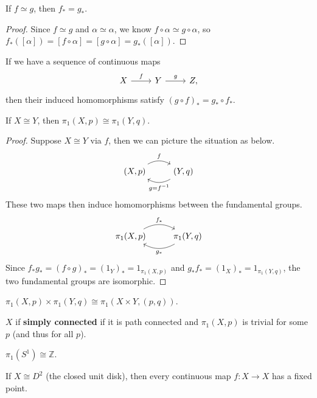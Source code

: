 \documentclass[twoside,10pt]{report}
\begin{document}
\begin{cor}
If $f \simeq g$, then $f_{*}=g_{*}$.
\end{cor}
\begin{proof}
	Since $f \simeq g$ and $\alpha \simeq \alpha$, we know $f\circ \alpha \simeq g\circ \alpha$, so $f_{*}([\alpha]) = [f\circ \alpha] = [g\circ \alpha]=g_{*}([\alpha])$.
\end{proof}

\begin{prop}
If we have a sequence of continuous maps
\[
	\begin{tikzcd}
		X\rar{f}&Y\rar{g}&Z,
	\end{tikzcd}
\] 
then their induced homomorphisms satisfy $(g\circ f)_{*}=g_{*}\circ f_{*}$.
\end{prop}

\begin{thrm}[]
	If $X \cong Y$, then $\pi_1(X,p) \cong \pi_1(Y,q)$.
\end{thrm}
\begin{proof}
	Suppose $X \cong Y$ via $f$, then we can picture the situation as below.
	\[
	\begin{tikzcd}
		(X,p)\arrow[r,"f",bend left]&(Y,q)\arrow[l,"g=f^{-1}",bend left]
	\end{tikzcd}
	\] 
	These two maps then induce homomorphisms between the fundamental groups.
	\[
        \begin{tikzcd}
                \pi_1(X,p)\arrow[r,"f_{*}",bend left]&\pi_1(Y,q)\arrow[l,"g_{*}",bend left]
        \end{tikzcd}
        \]
	Since $f_{*}g_{*}=(f\circ g)_{*}=(1_{Y})_{*}=1_{\pi_1(X,p)}$ and $g_{*}f_{*}=(1_{X})_{*}=1_{\pi_1(Y,q)}$, the two fundamental groups are isomorphic.
\end{proof}

\begin{prop}
	$\pi_1(X,p) \times \pi_1(Y,q) \cong \pi_1(X\times Y,(p,q))$.
\end{prop}

\begin{defn}[]
	$X$ if \textbf{simply connected} if it is path connected and $\pi_1(X,p)$ is trivial for some $p$ (and thus for all $p$).
\end{defn}

\begin{thrm}[]
	$\pi_1(S^{1})\cong \mathbb{Z}$.
\end{thrm}

\begin{thrm}
	If $X \cong D^{2}$ (the closed unit disk), then every continuous map $f:X\to X$ has a fixed point.
\end{thrm}
\end{document}
